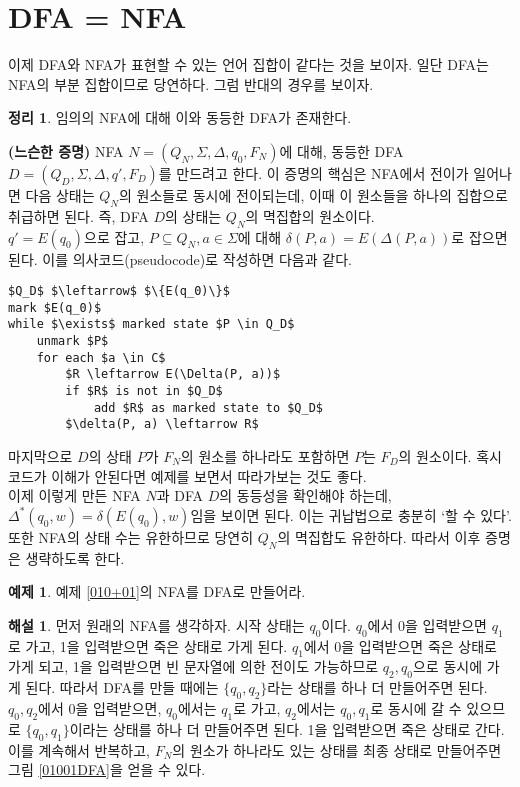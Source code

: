 \documentclass[b5paper, 11pt]{book}
\theoremstyle{definition}
\newtheorem{thm}[defn]{정리}
\newtheorem{ex}[defn]{예제}
\newtheorem*{ans*}{해설}
\newenvironment{pf*}{\pushQED{\qed}\pf}
{\popQED\endpf}
\begin{document}
\section{DFA = NFA}
이제 DFA와 NFA가 표현할 수 있는 언어 집합이 같다는 것을 보이자. 일단 DFA는 NFA의 부분 집합이므로 당연하다. 그럼 반대의 경우를 보이자.
\begin{thm} \label{dfa nfa equiv}
    임의의 NFA에 대해 이와 동등한 DFA가 존재한다.
\end{thm}
\begin{pf*}
\textbf{(느슨한 증명)}
NFA $N = (Q_N, \Sigma, \Delta, q_0, F_N)$에 대해, 동등한 DFA $D = ( Q_D, \Sigma, \Delta, q', F_D)$를 만드려고 한다. 이 증명의 핵심은 NFA에서 전이가 일어나면 다음 상태는 $Q_N$의 원소들로 동시에 전이되는데, 이때 이 원소들을 하나의 집합으로 취급하면 된다. 즉, DFA $D$의 상태는 $Q_N$의 멱집합의 원소이다. \\
$q' = E(q_0)$으로 잡고, $P \subseteq Q_N, a \in \Sigma$에 대해 $\delta(P, a) = E( \Delta(P, a) )$로 잡으면 된다. 이를 의사코드(pseudocode)로 작성하면 다음과 같다.
\begin{lstlisting}
$Q_D$ $\leftarrow$ $\{E(q_0)\}$
mark $E(q_0)$
while $\exists$ marked state $P \in Q_D$
    unmark $P$
    for each $a \in C$
        $R \leftarrow E(\Delta(P, a))$
        if $R$ is not in $Q_D$
            add $R$ as marked state to $Q_D$ 
        $\delta(P, a) \leftarrow R$
\end{lstlisting}
마지막으로 $D$의 상태 $P$가 $F_N$의 원소를 하나라도 포함하면 $P$는 $F_D$의 원소이다. 혹시 코드가 이해가 안된다면 예제를 보면서 따라가보는 것도 좋다. \\ 
이제 이렇게 만든 NFA $N$과 DFA $D$의 동등성을 확인해야 하는데, $\Delta^*(q_0, w) = \delta(E(q_0), w)$임을 보이면 된다. 이는 귀납법으로 충분히 `할 수 있다'. 또한 NFA의 상태 수는 유한하므로 당연히 $Q_N$의 멱집합도 유한하다. 따라서 이후 증명은 생략하도록 한다. 
\end{pf*}
\begin{ex}
    예제 \ref{010+01}의 NFA를 DFA로 만들어라. 
\end{ex} 
\begin{ans*}
    먼저 원래의 NFA를 생각하자. 시작 상태는 $q_0$이다. $q_0$에서 0을 입력받으면 $q_1$로 가고, 1을 입력받으면 죽은 상태로 가게 된다. $q_1$에서 0을 입력받으면 죽은 상태로 가게 되고, 1을 입력받으면 빈 문자열에 의한 전이도 가능하므로 $q_2, q_0$으로 동시에 가게 된다. 따라서 DFA를 만들 때에는 $\{q_0, q_2\}$라는 상태를 하나 더 만들어주면 된다. ${q_0, q_2}$에서 0을 입력받으면, $q_0$에서는 $q_1$로 가고, $q_2$에서는 ${q_0, q_1}$로 동시에 갈 수 있으므로 $\{q_0, q_1\}$이라는 상태를 하나 더 만들어주면 된다. 1을 입력받으면 죽은 상태로 간다. 이를 계속해서 반복하고, $F_N$의 원소가 하나라도 있는 상태를 최종 상태로 만들어주면 그림 \ref{01001DFA}을 얻을 수 있다.
\end{ans*}
\end{document}
